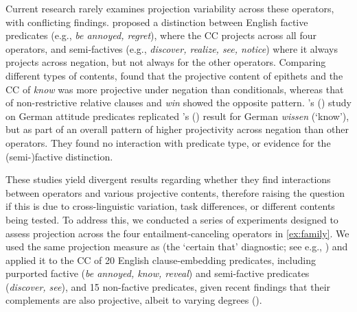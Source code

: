 \documentclass[12pt, a4paper]{article}
\newcommand{\posscite}[1]{\citeauthor{#1}'s (\citeyear{#1})}
\begin{document}
	\vspace{-.5\baselineskip}
	\noindent  Current research rarely examines projection variability across these operators, with conflicting findings.
	\citet{karttunen_observations_1971} proposed a distinction between English factive predicates (e.g., \emph{be annoyed, regret}), where the CC projects across all four operators, and semi-factives (e.g., \emph{discover, realize, see, notice}) where it always projects across negation, but not always for the other operators.
	Comparing different types of contents, \citet{smith_relationship_2014} found that the projective content of epithets and the CC of \emph{know} was more projective under negation than conditionals,
	whereas that of non-restrictive relative clauses and \emph{win} showed the opposite pattern.
	\posscite{sieker_projective_2022} study on German attitude predicates replicated \posscite{smith_relationship_2014} result for German \emph{wissen} (`know'), but as part of an overall pattern of higher projectivity across negation than other operators. They found no interaction with predicate type, or evidence for the (semi-)factive distinction.
	
	These studies yield divergent results regarding whether they find interactions between operators and various projective contents, therefore raising the question if this is due to cross-linguistic variation, task differences, or different contents being tested. To address this, we conducted a series of experiments designed to assess projection across the four entailment-canceling operators in \ref{ex:family}. We used the same projection measure as \citet{sieker_projective_2022} (the `certain that' diagnostic; see e.g., \citealp{tonhauser_how_2018,djarv_prosodic_2017,mahler_social_2020}) and applied it to the CC of 20 English clause-embedding predicates, including purported factive (\emph{be annoyed, know, reveal}) and semi-factive predicates (\emph{discover, see}),
	and 15 non-factive predicates, given recent findings that their complements are also projective, albeit to varying degrees (\citealt{degen_are_2022}).
\end{document}
